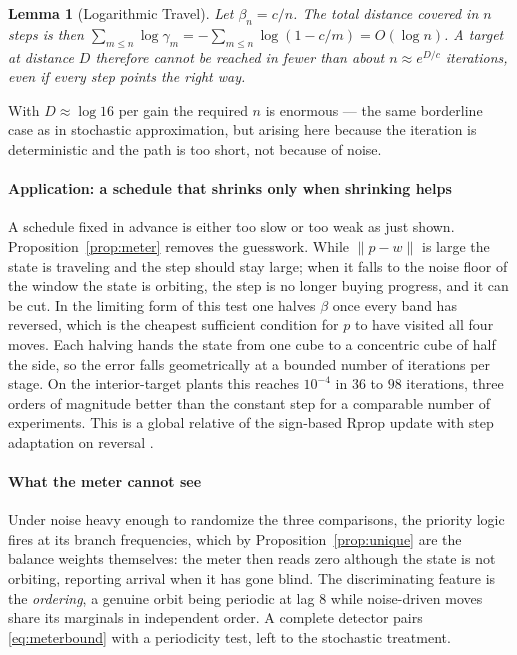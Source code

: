 \documentclass[letterpaper, 10pt, conference, twocolumn]{ieeeconf}
\newtheorem{lemma}{Lemma}
\begin{document}
\begin{lemma}[Logarithmic Travel]
\label{lem:travel}
Let $\beta_n = c/n$. The total distance covered in $n$ steps is then
$\sum_{m \le n} \log\gamma_m = -\sum_{m \le n}\log(1 - c/m) = O(\log n)$.
A target at distance $D$ therefore cannot be reached in fewer than about
$n \approx e^{D/c}$ iterations, even if every step points the right way.
\end{lemma}

With $D \approx \log 16$ per gain the required $n$ is enormous --- the same
borderline case as in stochastic approximation, but arising here because the
iteration is deterministic and the path is too short, not because of noise.



\paragraph{Application: a schedule that shrinks only when shrinking helps}
A schedule fixed in advance is either too slow or too weak
as just shown. Proposition~\ref{prop:meter} removes the guesswork.
While $\lVert p - w \rVert$ is large the state is traveling and the step should
stay large; when it falls to the noise floor of the window the state is
orbiting, the step is no longer buying progress, and it can be cut. In the
limiting form of this test one halves $\beta$ once every band has reversed,
which is the cheapest sufficient condition for $p$ to have visited all four
moves. Each halving hands the state from one cube to a concentric cube of half
the side, so the error falls geometrically at a bounded number of iterations
per stage. On the interior-target plants this reaches $10^{-4}$ in $36$ to
$98$ iterations, three orders of magnitude better than the constant step for a
comparable number of experiments. This is a global relative of the sign-based Rprop
update with step adaptation on reversal \cite{Riedmiller1993}.

\paragraph{What the meter cannot see} Under noise heavy enough to randomize the
three comparisons, the priority logic fires at its branch frequencies, which by
Proposition~\ref{prop:unique} are the balance weights themselves: the meter
then reads zero although the state is not orbiting, reporting arrival when it
has gone blind. The discriminating feature is the \emph{ordering}, a genuine
orbit being periodic at lag $8$ while noise-driven moves share its marginals in
independent order. A complete detector pairs \eqref{eq:meterbound} with a
periodicity test, left to the stochastic treatment.
\end{document}
